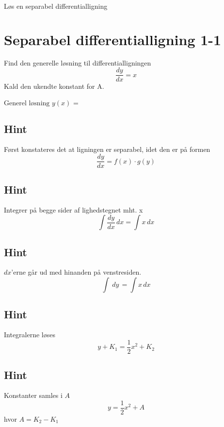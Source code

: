 \documentclass{article}
\newenvironment{exercise}[1]{\newpage\section{#1}}{}
\newcommand{\answerbox}[1]{\fbox{$#1$}}
\newcommand{\hint}{\subsection*{Hint}}
\begin{document}
Løs en separabel differentialligning
\tableofcontents
\newpage

\begin{exercise}{Separabel differentialligning 1-1}


Find den generelle løsning til differentialligningen 
\[
\frac{dy}{dx} = x 
\]
Kald den ukendte konstant for A.

$\textrm{Generel løsning } y(x)$ = \answerbox{\frac{1}{2}x^2 + A}

\hint

Først konstateres det at ligningen er separabel, idet den er på formen
\[
\frac{dy}{dx} = f(x) \cdot g(y)
\]


\hint

Integrer på begge sider af lighedstegnet mht. x
\[
\int\frac{dy}{dx}\, dx= \int x\,dx
\]

\hint

$dx$'erne går ud med hinanden på venstresiden.
\[
\int\ dy\,= \int x\,dx
\]

\hint

Integralerne løses
\[
y + K_1 = \frac{1}{2} x^2 + K_2
\]


\hint

Konstanter samles i $A$
\[
y = \frac{1}{2}x^2 + A
\]
hvor $A=K_2-K_1$

\end{exercise}


\newpage
\end{document}
